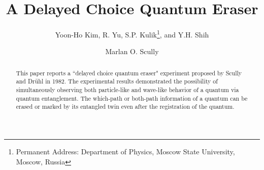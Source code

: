 

\draft
\title{A Delayed Choice Quantum Eraser}
\author{Yoon-Ho Kim, R. Yu, S.P. Kulik\thanks{Permanent Address: Department of Physics,
Moscow State University, Moscow, Russia}, and Y.H. Shih}
\address{Department of Physics, University of Maryland, Baltimore County,\\
Baltimore, MD 21250}
\author{Marlan O. Scully}
\address{Department of Physics, Texas A \& M University, College Station, TX 77842\\
and Max-Planck Institut f\"{u}r Quantenoptik, M\"{u}nchen, Germany\\(submitted to PRL)}

\maketitle

\widetext

\begin{abstract}
This paper reports a ``delayed choice quantum eraser" experiment proposed by Scully and
Dr\"{u}hl in 1982. The experimental results demonstrated the possibility of
simultaneously observing both particle-like and wave-like behavior of a quantum via
quantum entanglement. The which-path or both-path information of a quantum can be erased
or marked by its entangled twin even after the registration of the quantum.
\end{abstract}


\narrowtext

